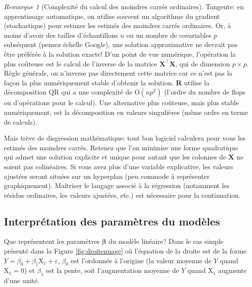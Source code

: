 \documentclass[
  11pt,
  letterpaper,
]{article}
\theoremstyle{definition}
\theoremstyle{definition}
\theoremstyle{definition}
\theoremstyle{remark}
\newtheorem*{remark}{Remarque}
\begin{document}
\begin{remark}[Complexité du calcul des moindres carrés ordinaires]
{}Tangente: en apprentissage automatique, on utilise souvent un algorithme du gradient (stochastique) pour estimer les estimés des moindres carrés ordinaires. Or, à moins d'avoir des tailles d'échantillons \(n\) ou un nombre de covariables \(p\) subséquent (pensez échelle Google), une solution approximative ne devrait pas être préférée à la solution exacte! D'un point de vue numérique, l'opération la plus coûteuse est le calcul de l'inverse de la matrice \(\mathbf{X}^\top\mathbf{X}\), qui de dimension \(p \times p\). Règle générale, on n'inverse pas directement cette matrice car ce n'est pas la façon la plus numériquement stable d'obtenir la solution. \textbf{R} utilise la décomposition QR qui a une complexité de \(\mathrm{O}(np^2)\) (l'ordre du nombre de flops ou d'opérations pour le calcul). Une alternative plus coûteuse, mais plus stable numériquement, est la décomposition en valeurs singulières (même ordre en terme de calculs).
\end{remark}

Mais trève de disgression mathématique: tout bon logiciel calculera pour vous les estimés des moindres carrés. Retenez que l'on minimise une forme quadratique qui admet une solution explicite et unique pour autant que les colonnes de \(\mathbf{X}\) ne soient pas colinéaires. Si vous avez plus d'une variable explicative, les valeurs ajustées seront situées sur un hyperplan (peu commode à représenter graphiquement). Maîtriser le langage associé à la régression (notamment les résidus ordinaires, les valeurs ajustées, etc.) est nécessaire pour la continuation.

\hypertarget{interpruxe9tation-des-paramuxe8tres-du-moduxe8les}{%
\subsection{Interprétation des paramètres du modèles}\label{interpruxe9tation-des-paramuxe8tres-du-moduxe8les}}

Que représentent les paramètres \(\boldsymbol{\beta}\) du modèle linéaire? Dans le cas simple présenté dans la Figure \ref{fig:droitenuage} où l'équation de la droite est de la forme \(Y = \beta_0 + \beta_1\mathrm{X}_1 + \varepsilon\), \(\beta_0\) est l'ordonnée à l'origine (la valeur moyenne de \(Y\) quand \(\mathrm{X}_1=0\)) et \(\beta_1\) est la pente, soit l'augmentation moyenne de \(Y\) quand \(\mathrm{X}_1\) augmente d'une unité.
\end{document}

